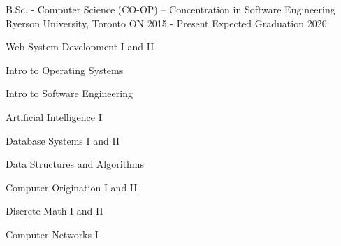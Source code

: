 \vspace*{-3mm}
\begin{cventries}
  \cventry
    {B.Sc. - Computer Science (CO-OP) -- Concentration in Software Engineering}
    {Ryerson University, Toronto ON}
    {2015 - Present}
    {Expected Graduation 2020}
    {    }
    \end{cventries}
    \vspace*{-7mm}
    \begin{cventries}
    {
       \begin{multicols}{3}%
        \vspace*{-6mm}
            \begin{cvitems}
                \item {Web System Development I and II}
                \item {Intro to Operating Systems}
               \item {Intro to Software Engineering}
            \end{cvitems}
        \columnbreak
       \vspace*{-6mm}
        \begin{cvitems}
            \item {Artificial Intelligence I}
            \item {Database Systems I and II}
           \item{Data Structures and Algorithms}
     \end{cvitems}
        \columnbreak
         \vspace*{-6mm}
            \begin{cvitems}
                \item {Computer Origination I and II}
                \item {Discrete Math I and II}
                \item {Computer Networks I}
          \end{cvitems}
        \end{multicols}
    }
    \end{cventries}
    \vspace*{-14mm}
